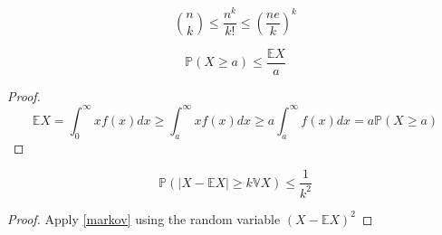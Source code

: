 \begin{corollary}
	\begin{equation}
		\binom{n}{k} \leq \frac{n^k}{k!} \leq (\frac{ne}{k})^k
	\end{equation}
\end{corollary}

\begin{theorem}\label{markov}
	\begin{equation}
		\mathbb{P}(X \geq a) \leq \frac{\mathbb{E}X}{a}
	\end{equation}
\end{theorem}
\begin{proof}
    \begin{equation}
        \mathbb{E}X = \int_0^{\infty}x f(x)dx \geq \int_a^{\infty} xf(x)dx \geq  a\int_a^{\infty} f(x)dx =a \mathbb{P}(X\geq a)
    \end{equation}
\end{proof}


\begin{corollary}\label{cheby}
	\begin{equation}
		\mathbb{P}(|X - \mathbb{E}X| \geq k \mathbb{V}X ) \leq \frac{1}{k^2}
	\end{equation}
\end{corollary}
\begin{proof}
    Apply \ref{markov} using the random variable $(X-\mathbb{E}X)^2$
\end{proof}
